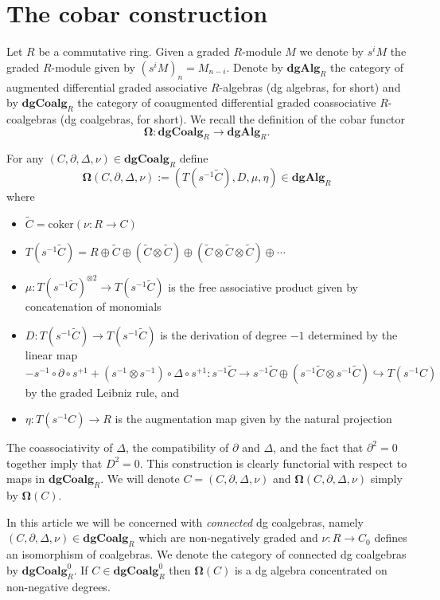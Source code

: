 \section{The cobar construction}

Let $R$ be a commutative ring. Given a graded $R$-module $M$ we denote by $s^{i}M$ the graded $R$-module given by $(s^{i}M)_n= M_{n-i}$.
Denote by $\textbf{dgAlg}_R$ the category of augmented differential graded associative $R$-algebras (dg algebras, for short) and by $\textbf{dgCoalg}_R$ the category of coaugmented differential graded coassociative $R$-coalgebras (dg coalgebras, for short). We recall the definition of the cobar functor 
$$\mathbf{\Omega}: \textbf{dgCoalg}_R \to \textbf{dgAlg}_R.$$

For any $(C, \partial, \Delta, \nu)  \in \textbf{dgCoalg}_R$ define
$$\mathbf{\Omega}(C, \partial, \Delta, \nu) := ( T(s^{-1}  \widetilde{C} ), D, \mu, \eta) \in \textbf{dgAlg}_R$$ where 
\begin{itemize}
\item $\widetilde{C}=\text{coker}(\nu: R \to C)$
\item $T(s^{-1} \widetilde{C})= R \oplus \widetilde{C} \oplus (\widetilde{C}  \otimes \widetilde{C} ) \oplus ( \widetilde{C} \otimes \widetilde{C} \otimes \widetilde{C} ) \oplus\cdots $
\item $\mu: T(s^{-1}  \widetilde{C} )^{\otimes 2} \to T(s^{-1}  \widetilde{C} ) $ is the free associative product given by concatenation of monomials
\item $D: T(s^{-1}  \widetilde{C} ) \to T(s^{-1}  \widetilde{C} )$ is the derivation of degree $-1$ determined by the linear map $$- s^{-1} \circ \partial \circ s^{+1} + (s^{-1} \otimes s^{-1}) \circ \Delta \circ s^{+1}: s^{-1}\widetilde{C} \to s^{-1}\widetilde{C} \oplus (s^{-1}\widetilde{C} \otimes s^{-1}\widetilde{C}) \hookrightarrow T(s^{-1}C)$$  by the graded Leibniz rule, and
\item $\eta: T(s^{-1}C) \to R$ is the augmentation map given by the natural projection
\end{itemize}

The coassociativity of $\Delta$, the compatibility of $\partial$ and $\Delta$, and the fact that $\partial^2 =0$ together imply that $D^2=0$. This construction is clearly functorial with respect to maps in $\textbf{dgCoalg}_R$. We will denote $C=(C, \partial, \Delta, \nu)$ and $\mathbf{\Omega} (C, \partial, \Delta, \nu)$ simply by $\mathbf{\Omega}(C)$. 

In this article we will be concerned with \textit{connected} dg coalgebras, namely $(C, \partial, \Delta, \nu) \in \textbf{dgCoalg}_R$ which are non-negatively graded and $\nu: R \to C_0$ defines an isomorphism of coalgebras. We denote the category of connected dg coalgebras by $\textbf{dgCoalg}^0_R$. If $C \in \textbf{dgCoalg}_R^0$ then $\mathbf{\Omega}(C)$ is a dg algebra concentrated on non-negative degrees. 

